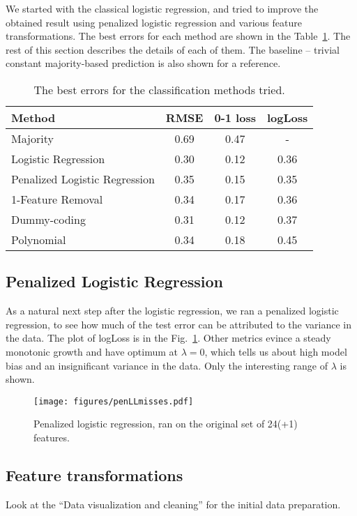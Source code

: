 \documentclass{article} %
\begin{document}
We started with the classical logistic regression, and tried to improve the obtained result using penalized logistic regression and various feature transformations. The best errors for each method are shown in the Table~\ref{tab:classification-errors}. The rest of this section describes the details of each of them. The baseline -- trivial constant majority-based prediction is also shown for a reference.
\begin{table}[h]
  \begin{center}
    \begin{tabular}{l|ccc}
      Method & RMSE & 0-1 loss & logLoss \\
      \hline
      Majority & 0.69 & 0.47 & - \\
      Logistic Regression & 0.30 & 0.12 & 0.36 \\
      Penalized Logistic Regression & 0.35 & 0.15 & 0.35  \\
      1-Feature Removal & 0.34 & 0.17 & 0.36 \\
      Dummy-coding & 0.31 & 0.12 & 0.37 \\
      Polynomial & 0.34 & 0.18 & 0.45
    \end{tabular}
    \caption{The best errors for the classification methods tried.}
    \label{tab:classification-errors}
  \end{center}
\end{table}

\subsection{Penalized Logistic Regression}
As a natural next step after the logistic regression, we ran a penalized logistic regression, to see how much of the test error can be attributed to the variance in the data. The plot of logLoss is in the Fig.~\ref{fig:penLLmisses}. Other metrics evince a steady monotonic growth and have optimum at $\lambda = 0$, which tells us about high model bias and an insignificant variance in the data. Only the interesting range of $\lambda$ is shown.

\begin{figure}[h]
\center
\texttt{[image: figures/penLLmisses.pdf]}
\caption{Penalized logistic regression, ran on the original set of 24(+1) features.}
\label{fig:penLLmisses}
\end{figure}

\subsection{Feature transformations}
Look at the ``Data visualization and cleaning'' for the initial data preparation.
\end{document}
